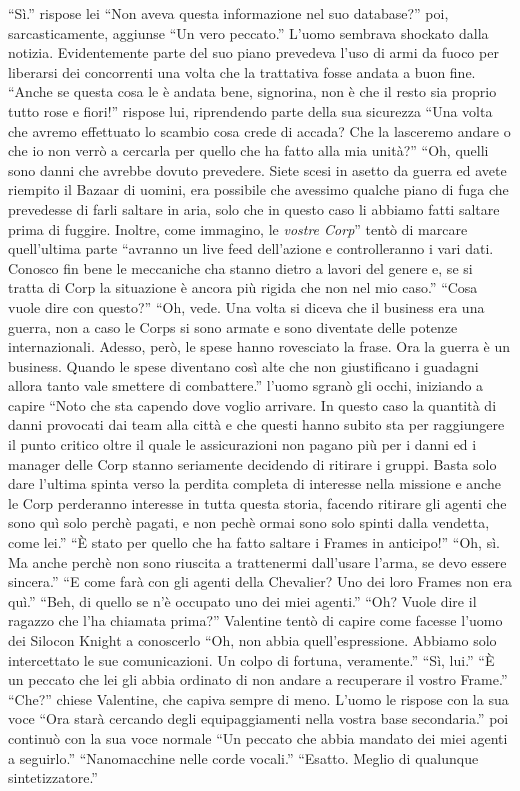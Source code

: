     ``Sì.'' rispose lei ``Non aveva questa informazione nel suo database?'' poi, sarcasticamente, aggiunse ``Un vero
    peccato.'' L'uomo sembrava shockato dalla notizia. Evidentemente parte del suo piano prevedeva l'uso di armi da
    fuoco per liberarsi dei concorrenti una volta che la trattativa fosse andata a buon fine. ``Anche se questa cosa le
    è andata bene, signorina, non è che il resto sia proprio tutto rose e fiori!'' rispose lui, riprendendo parte della
    sua sicurezza ``Una volta che avremo effettuato lo scambio cosa crede di accada? Che la lasceremo andare o che io
    non verrò a cercarla per quello che ha fatto alla mia unità?'' ``Oh, quelli sono danni che avrebbe dovuto prevedere.
    Siete scesi in asetto da guerra ed avete riempito il Bazaar di uomini, era possibile che avessimo qualche piano di
    fuga che prevedesse di farli saltare in aria, solo che in questo caso li abbiamo fatti saltare prima di fuggire.
    Inoltre, come immagino, le \emph{vostre Corp}'' tentò di marcare quell'ultima parte ``avranno un live feed
    dell'azione e controlleranno i vari dati. Conosco fin bene le meccaniche cha stanno dietro a lavori del genere e, se
    si tratta di Corp la situazione è ancora più rigida che non nel mio caso.'' ``Cosa vuole dire con questo?'' ``Oh,
    vede. Una volta si diceva che il business era una guerra, non a caso le Corps si sono armate e sono diventate delle
    potenze internazionali. Adesso, però, le spese hanno rovesciato la frase. Ora la guerra è un business. Quando le
    spese diventano così alte che non giustificano i guadagni allora tanto vale smettere di combattere.'' l'uomo sgranò
    gli occhi, iniziando a capire ``Noto che sta capendo dove voglio arrivare. In questo caso la quantità di danni
    provocati dai team alla città e che questi hanno subito sta per raggiungere il punto critico oltre il quale le
    assicurazioni non pagano più per i danni ed i manager delle Corp stanno seriamente decidendo di ritirare i gruppi.
    Basta solo dare l'ultima spinta verso la perdita completa di interesse nella missione e anche le Corp perderanno
    interesse in tutta questa storia, facendo ritirare gli agenti che sono quì solo perchè pagati, e non pechè ormai
    sono solo spinti dalla vendetta, come lei.'' ``È stato per quello che ha fatto saltare i Frames in anticipo!'' ``Oh,
    sì. Ma anche perchè non sono riuscita a trattenermi dall'usare l'arma, se devo essere sincera.'' ``E come farà con
    gli agenti della Chevalier? Uno dei loro Frames non era quì.'' ``Beh, di quello se n'è occupato uno dei miei
    agenti.'' ``Oh? Vuole dire il ragazzo che l'ha chiamata prima?'' Valentine tentò di capire come facesse l'uomo dei
    Silocon Knight a conoscerlo ``Oh, non abbia quell'espressione. Abbiamo solo intercettato le sue comunicazioni. Un
    colpo di fortuna, veramente.'' ``Sì, lui.'' ``È un peccato che lei gli abbia ordinato di non andare a recuperare il
    vostro Frame.'' ``Che?'' chiese Valentine, che capiva sempre di meno. L'uomo le rispose con la sua voce ``Ora starà
    cercando degli equipaggiamenti nella vostra base secondaria.'' poi continuò con la sua voce normale ``Un peccato che
    abbia mandato dei miei agenti a seguirlo.'' ``Nanomacchine nelle corde vocali.'' ``Esatto. Meglio di qualunque
    sintetizzatore.''

